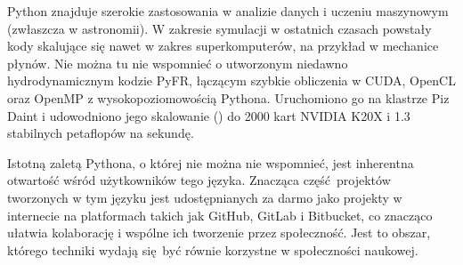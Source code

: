 Python znajduje szerokie zastosowania w analizie danych i uczeniu maszynowym
(zwłaszcza w astronomii\cite{astropy}). W zakresie symulacji w ostatnich czasach powstały
kody skalujące się nawet w zakres superkomputerów, na przykład w mechanice
płynów.  Nie można tu nie wspomnieć o utworzonym niedawno hydrodynamicznym kodzie
PyFR, łączącym szybkie obliczenia w CUDA, OpenCL oraz OpenMP z wysokopoziomowością Pythona. Uruchomiono go na klastrze Piz Daint
i udowodniono jego skalowanie () do 2000 kart NVIDIA K20X i 1.3 stabilnych petaflopów na sekundę.~\cite{pyfr}~\cite{pyfr-euroscipy}

Istotną zaletą Pythona, o której nie można nie wspomnieć, jest inherentna
otwartość wśród użytkowników tego języka. Znacząca część projektów tworzonych w
tym języku jest udostępnianych za darmo jako projekty  w
internecie na platformach takich jak GitHub, GitLab i Bitbucket, co znacząco
ułatwia kolaborację i wspólne ich tworzenie przez społeczność.  Jest to obszar,
którego techniki wydają się być równie korzystne w społeczności naukowej.

